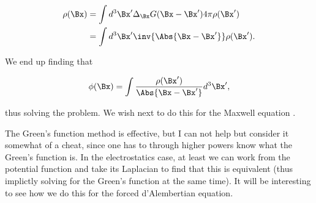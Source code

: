 \begin{equation}\label{eqn:relativisticElectrodynamicsL17b:430}
\begin{aligned}
\rho(\Bx)
&=
\int d^3 \Bx' \Delta_{\Bx} G(\Bx - \Bx') 4 \pi \rho(\Bx') \\
&=
\int d^3 \Bx' \inv{\Abs{\Bx - \Bx'}} \rho(\Bx').
\end{aligned}
\end{equation}

We end up finding that 

\begin{equation}\label{eqn:relativisticElectrodynamicsL17b:390}
\phi(\Bx) = \int \frac{\rho(\Bx')}{\Abs{\Bx - \Bx'}} d^3 \Bx',
\end{equation}

thus solving the problem.  We wish next to do this for the Maxwell equation .

The Green's function method is effective, but I can not help but consider it somewhat of a cheat, since one has to through higher powers know what the Green's function is.  In the electrostatics case, at least we can work from the potential function and take its Laplacian to find that this is equivalent (thus implictly solving for the Green's function at the same time).  It will be interesting to see how we do this for the forced d'Alembertian equation.
